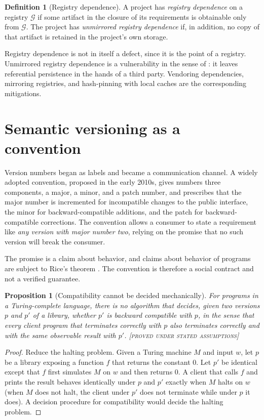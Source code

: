 \documentclass[11pt,twoside,openright]{book}
\theoremstyle{plain}
\newtheorem{proposition}[theorem]{Proposition}
\theoremstyle{definition}
\newtheorem{definition}[theorem]{Definition}
\theoremstyle{remark}
\newcommand{\Proved}{\textup{\textsc{[proved under stated assumptions]}}}
\begin{document}
\begin{definition}[Registry dependence]\label{def:regdep}
A project has \emph{registry dependence} on a registry $\mathcal{G}$ if some artifact in the closure of its requirements is obtainable only from $\mathcal{G}$. The project has \emph{unmirrored registry dependence} if, in addition, no copy of that artifact is retained in the project's own storage.
\end{definition}

Registry dependence is not in itself a defect, since it is the point of a registry. Unmirrored registry dependence is a vulnerability in the sense of : it leaves referential persistence in the hands of a third party. Vendoring dependencies, mirroring registries, and hash-pinning with local caches are the corresponding mitigations.

\section{Semantic versioning as a convention}

Version numbers began as labels and became a communication channel. A widely adopted convention, proposed in the early 2010s, gives numbers three components, a major, a minor, and a patch number, and prescribes that the major number is incremented for incompatible changes to the public interface, the minor for backward-compatible additions, and the patch for backward-compatible corrections. The convention allows a consumer to state a requirement like \emph{any version with major number two}, relying on the promise that no such version will break the consumer.

The promise is a claim about behavior, and claims about behavior of programs are subject to Rice's theorem \cite{rice1953}. The convention is therefore a social contract and not a verified guarantee.

\begin{proposition}[Compatibility cannot be decided mechanically]\label{prop:semver}
For programs in a Turing-complete language, there is no algorithm that decides, given two versions $p$ and $p'$ of a library, whether $p'$ is backward compatible with $p$, in the sense that every client program that terminates correctly with $p$ also terminates correctly and with the same observable result with $p'$.
\Proved{}
\end{proposition}

\begin{proof}
Reduce the halting problem. Given a Turing machine $M$ and input $w$, let $p$ be a library exposing a function $f$ that returns the constant $0$. Let $p'$ be identical except that $f$ first simulates $M$ on $w$ and then returns $0$. A client that calls $f$ and prints the result behaves identically under $p$ and $p'$ exactly when $M$ halts on $w$ (when $M$ does not halt, the client under $p'$ does not terminate while under $p$ it does). A decision procedure for compatibility would decide the halting problem.
\end{proof}
\end{document}
